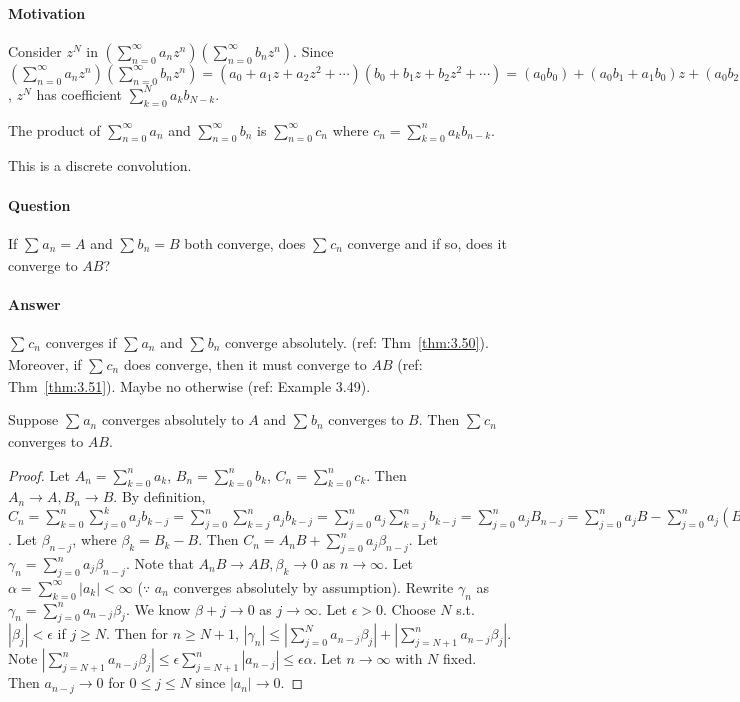\paragraph{Motivation}
Consider $z^{N}$ in $(\sum_{n=0}^{\infty}{a_{n}z^{n}})(\sum_{n=0}^{\infty}{b_{n}z^{n}})$.
Since $(\sum_{n=0}^{\infty}{a_{n}z^{n}})(\sum_{n=0}^{\infty}{b_{n}z^{n}})
	=(a_0+a_1z+a_2z^2+\cdots)(b_0+b_1z+b_2z^2+\cdots)=(a_0b_0)+(a_0b_1+a_1b_0)z+(a_0b_2+a_1b_1+a_2b_0)z^2+\cdots$, $z^{N}$ has coefficient $\sum_{k=0}^{N}{a_kb_{N-k}}$.
\begin{definition}
	The product of $\sum_{n=0}^{\infty}{a_{n}}$ and $\sum_{n=0}^{\infty}{b_{n}}$ is $\sum_{n=0}^{\infty}{c_{n}}$ where $c_{n}=\sum_{k=0}^{n}{a_kb_{n-k}}$.
	\begin{note}
		This is a discrete convolution.
	\end{note}
\end{definition}

\paragraph{Question}
If $\sum_{}{a_{n}}=A$ and $\sum_{}{b_{n}}=B$ both converge, does $\sum_{}{c_{n}}$ converge and if so, does it converge to $AB$?
\paragraph{Answer}
$\sum_{}{c_{n}}$ converges if $\sum_{}{a_{n}}$ and $\sum_{}{b_{n}}$ converge absolutely. (ref: Thm~\ref{thm:3.50}). Moreover, if $\sum_{}{c_{n}}$ does converge, then it must converge to $AB$ (ref: Thm~\ref{thm:3.51}). Maybe no otherwise (ref: Example 3.49).

\begin{theorem}[Thm 3.50]
	\label{thm:3.50}
	Suppose $\sum_{}{a_{n}}$ converges absolutely to $A$ and $\sum_{}{b_{n}}$ converges to $B$. Then $\sum_{}{c_n}$ converges to $AB$.
	\begin{proof}
		Let $A_{n}=\sum_{k=0}^{n}{a_{k}}$, $B_{n}=\sum_{k=0}^{n}{b_{k}}$, $C_{n}=\sum_{k=0}^{n}{c_{k}}$.
		Then $A_{n} \to  A, B_{n}\to B$.
		By definition, $C_{n}=\sum_{k=0}^{n}{\sum_{j=0}^{k}{a_{j}b_{k-j}}}=\sum_{j=0}^{n}{\sum_{k=j}^{n}{a_j b_{k-j}}}=\sum_{j=0}^{n}{a_{j} \sum_{k=j}^{n}{b_{k-j}}}
			=\sum_{j=0}^{n}{a_{j}B_{n-j}}=\sum_{j=0}^{n}{a_{j}B}-\sum_{j=0}^{n}{a_{j}(B_{n-j}-B)}$. Let $\beta_{n-j}$, where $\beta_k=B_k -B$.
		Then $C_n=A_nB + \sum_{j=0}^{n}{a_{j}\beta_{n-j}}$. Let $\gamma_n=\sum_{j=0}^{n}{a_{j}\beta_{n-j}}$.
		Note that $A_nB \to AB, \beta_k \to 0$ as $n\to \infty$.
		Let $\alpha=\sum_{k=0}^{\infty}{|a_k|}<\infty $  ($\because$ $a_{n}$ converges absolutely by assumption). Rewrite $\gamma_n$ as $\gamma_n=\sum_{j=0}^{n}{a_{n-j} \beta_j}$. We know $\beta+j \to 0$ as $j\to \infty$.
		Let $\epsilon>0$. Choose $N$ s.t. $|\beta_j|<\epsilon$ if $j\ge N$.
		Then for $n\ge N+1$, $|\gamma_n|\le |\sum_{j=0}^{N}{a_{n-j}\beta_j}|+|\sum_{j=N+1}^{n}{a_{n-j}\beta_j}|$. Note $|\sum_{j=N+1}^{n}{a_{n-j}\beta_j}| \le \epsilon \sum_{j=N+1}^{n}{|a_{n-j}|}\le \epsilon \alpha$.
		Let $n\to \infty$ with $N$ fixed. Then $a_{n-j}\to 0$ for $0 \le j \le N$ since $|a_{n}|\to 0$.
	\end{proof}
\end{theorem}

